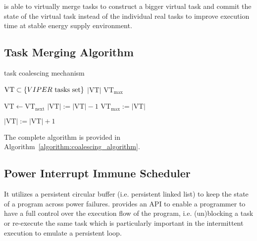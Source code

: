 \sys is able to virtually merge tasks to construct a bigger virtual task and commit the state of the virtual task instead of the individual real tasks to improve execution time at stable energy supply environment. 

\subsection{Task Merging Algorithm}

\begin{algorithm}[t]
	\caption{\sys task coalescing mechanism}
	\label{algorithm:coalescing_algorithm}
	\scriptsize
	\begin{algorithmic}[1]
		\State $\text{VT} \subset \{VIPER~\text{tasks set}\}$  
		\State $|\text{VT}|$ 
		\State $\text{VT}_{\max}$ 
		\vspace{0.1cm}
		
		\State $\text{VT} \leftarrow \text{VT}_{\text{next}}$ 
		\vspace{0.1cm}
		 				
		\State $|\text{VT}|:=|\text{VT}|-1$
		\State $\text{VT}_{\max} := |\text{VT}|$ 
		\EndIf
		\EndWhile
		
		\vspace{0.1cm}
		 
		 
		\State $|\text{VT}|:=|\text{VT}|+1$
		\EndIf
		\EndIf
		\EndWhile
	\end{algorithmic}
\end{algorithm}

The complete algorithm is provided in Algorithm~\ref{algorithm:coalescing_algorithm}. 

\subsection{Power Interrupt Immune Scheduler}


It utilizes a persistent circular buffer (i.e. persistent linked list) to keep the state of a program across power failures. \sys provides an API to enable a programmer to have a full control over the execution flow of the program, i.e. (un)blocking a task or re-execute the same task which is particularly important in the intermittent execution to emulate a persistent loop. 


